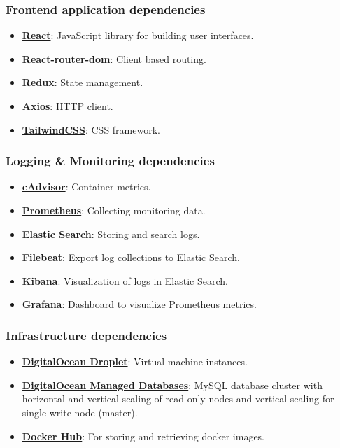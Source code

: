 \documentclass{article}
\begin{document}
\subsubsection{Frontend application dependencies}
\begin{itemize}
    \item \href{https://reactjs.org/}{\textbf{React}}: JavaScript library for building user interfaces.
    \item \href{https://v5.reactrouter.com/}{\textbf{React-router-dom}}: Client based routing.
    \item \href{https://redux.js.org/}{\textbf{Redux}}: State management.
    \item \href{https://axios-http.com/docs/intro}{\textbf{Axios}}: HTTP client.
    \item \href{https://tailwindcss.com/}{\textbf{TailwindCSS}}: CSS framework.
\end{itemize}

\subsubsection{Logging \& Monitoring dependencies}
\begin{itemize}
    \item \href{https://github.com/google/cadvisor}{\textbf{cAdvisor}}: Container metrics.
    \item \href{https://prometheus.io/}{\textbf{Prometheus}}: Collecting monitoring data.
    \item \href{https://www.elastic.co/elasticsearch/}{\textbf{Elastic Search}}: Storing and search logs.
    \item \href{https://www.elastic.co/beats/filebeat}{\textbf{Filebeat}}: Export log collections to Elastic Search.
    \item \href{https://www.elastic.co/kibana/}{\textbf{Kibana}}: Visualization of logs in Elastic Search.
    \item \href{https://grafana.com/}{\textbf{Grafana}}: Dashboard to visualize Prometheus metrics.
\end{itemize}

\subsubsection{Infrastructure dependencies}
\begin{itemize}
    \item \href{https://www.digitalocean.com/products/droplets}{\textbf{DigitalOcean Droplet}}: Virtual machine instances.
    \item \href{https://www.digitalocean.com/products/managed-databases}{\textbf{DigitalOcean Managed Databases}}: MySQL database cluster with horizontal and vertical scaling of read-only nodes and vertical scaling for single write node (master).
    \item \href{https://hub.docker.com/}{ \textbf{Docker Hub}}: For storing and retrieving docker images.
\end{itemize}
\end{document}
